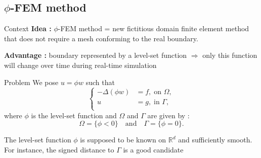 \documentclass[compress,10pt,xcolor={table,dvipsnames},t]{beamer}
\begin{document}
	\subsection{$\phi$-FEM method}
	
	\begin{frame}{Context}
		\textbf{Idea :} $\phi$-FEM method = new fictitious domain finite element method that does not require a mesh conforming to the real boundary.
		\begin{center}
		\end{center}
		\textbf{Advantage :} boundary represented by a level-set function $\Rightarrow$ only this function will change over time during real-time simulation
	\end{frame}
	
	\begin{frame}{Problem}
		We pose $u=\phi w$ such that
		$$\left\{\begin{aligned}
			-\Delta (\phi w) &= f, \; \text{on } \Omega, \\
			u&=g, \; \text{in } \Gamma, \\
		\end{aligned}\right.$$
		where $\phi$ is the level-set function and $\Omega$ and $\Gamma$ are given by :
		$$
		\Omega=\{\phi < 0\} \quad \text{and} \quad \Gamma=\{\phi = 0\}.$$
		\begin{center}
		\end{center}
		The level-set function $\phi$ is supposed to be known on $\mathbb{R}^d$ and sufficiently smooth. \\
		For instance, the signed distance to $\Gamma$ is a good candidate
	\end{frame}
	
\end{document}
